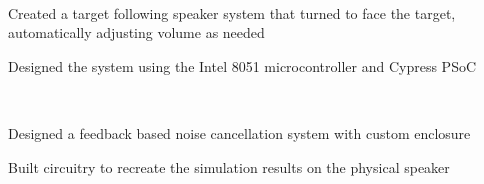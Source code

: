 \documentclass[letterpaper, article]{deedy-resume-openfont}
\begin{document}
\begin{minipage}[t]{0.66\textwidth}
\\
\begin{tightemize}
	\item Created a target following speaker system that turned to face the target, automatically adjusting volume as needed
	\item Designed the system using the Intel 8051 microcontroller and Cypress PSoC
\end{tightemize}

\\
\begin{tightemize}
	\item Designed a feedback based noise cancellation system with custom enclosure
	\item Built circuitry to recreate the simulation results on the physical speaker
\end{tightemize}

\end{minipage}
\hfill
%
%
\end{document}
